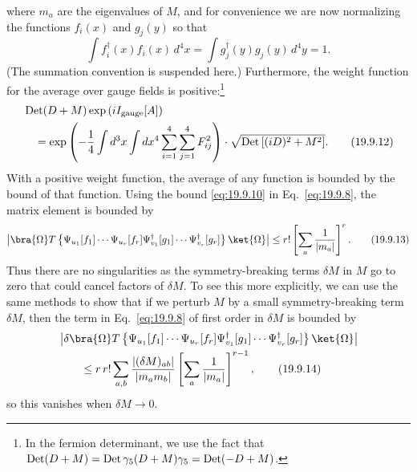 where $m_a$ are the eigenvalues of $M$, and for convenience we are now normalizing the functions $f_i(x)$ and $g_j(y)$ so that
\begin{equation}
\int f_i^\dagger(x)f_i(x)\,d^4x
=\int g_j^\dagger(y)g_j(y)\,d^4y
=1.
\tag{19.9.11}\label{eq:19.9.11}
\end{equation}
(The summation convention is suspended here.) Furthermore, the weight function for the average over gauge fields is positive:\footnote{In the fermion determinant, we use the fact that $\operatorname{Det}(\sl{D}+M)=\operatorname{Det}\gamma_5(\sl{D}+M)\gamma_5=\operatorname{Det}(-\sl{D}+M)$.}
\begin{align}
&\operatorname{Det}(\sl{D}+M)
\exp\left(iI_{\mathrm{gauge}}[A]\right)
\notag\\
&\quad=
\exp\left(
-\frac{1}{4}\int d^3x\int dx^4
\sum_{i=1}^4\sum_{j=1}^4F_{ij}^2
\right)
\cdot
\sqrt{\operatorname{Det}\left[(i\sl{D})^2+M^2\right]}.
\tag{19.9.12}\label{eq:19.9.12}
\end{align}
With a positive weight function, the average of any function is bounded by the bound of that function. Using the bound \eqref{eq:19.9.10} in Eq.~\eqref{eq:19.9.8}, the matrix element is bounded by
\begin{align}
\left|
\bra{\Omega}T\left\{
\Psi_{u_1}[f_1]\cdots\Psi_{u_r}[f_r]
\Psi^\dagger_{v_1}[g_1]\cdots\Psi^\dagger_{v_r}[g_r]
\right\}\ket{\Omega}
\right|
\leq r!\left[\sum_a\frac{1}{|m_a|}\right]^r.
\tag{19.9.13}\label{eq:19.9.13}
\end{align}
Thus there are no singularities as the symmetry-breaking terms $\delta M$ in $M$ go to zero that could cancel factors of $\delta M$. To see this more explicitly, we can use the same methods to show that if we perturb $M$ by a small symmetry-breaking term $\delta M$, then the term in Eq.~\eqref{eq:19.9.8} of first order in $\delta M$ is bounded by
\begin{align}
&\left|
\delta\bra{\Omega}T\left\{
\Psi_{u_1}[f_1]\cdots\Psi_{u_r}[f_r]
\Psi^\dagger_{v_1}[g_1]\cdots\Psi^\dagger_{v_r}[g_r]
\right\}\ket{\Omega}
\right|
\notag\\
&\qquad\leq
r\,r!\sum_{a,b}
\frac{|(\delta M)_{ab}|}{|m_am_b|}
\left[\sum_a\frac{1}{|m_a|}\right]^{r-1},
\tag{19.9.14}\label{eq:19.9.14}
\end{align}
so this vanishes when $\delta M\to0$.

